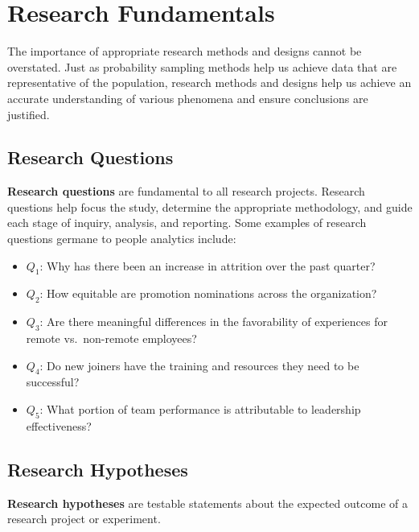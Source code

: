 \documentclass[]{book}
\providecommand{\tightlist}{%
  \setlength{\itemsep}{0pt}\setlength{\parskip}{0pt}}
\begin{document}
\hypertarget{research}{%
\chapter{Research Fundamentals}\label{research}}

The importance of appropriate research methods and designs cannot be overstated. Just as probability sampling methods help us achieve data that are representative of the population, research methods and designs help us achieve an accurate understanding of various phenomena and ensure conclusions are justified.

\hypertarget{research-questions}{%
\section{Research Questions}\label{research-questions}}

\textbf{Research questions} are fundamental to all research projects. Research questions help focus the study, determine the appropriate methodology, and guide each stage of inquiry, analysis, and reporting. Some examples of research questions germane to people analytics include:

\begin{itemize}
\tightlist
\item
  \(Q_1\): Why has there been an increase in attrition over the past quarter?
\item
  \(Q_2\): How equitable are promotion nominations across the organization?
\item
  \(Q_3\): Are there meaningful differences in the favorability of experiences for remote vs.~non-remote employees?
\item
  \(Q_4\): Do new joiners have the training and resources they need to be successful?
\item
  \(Q_5\): What portion of team performance is attributable to leadership effectiveness?
\end{itemize}

\hypertarget{research-hypotheses}{%
\section{Research Hypotheses}\label{research-hypotheses}}

\textbf{Research hypotheses} are testable statements about the expected outcome of a research project or experiment.
\end{document}
